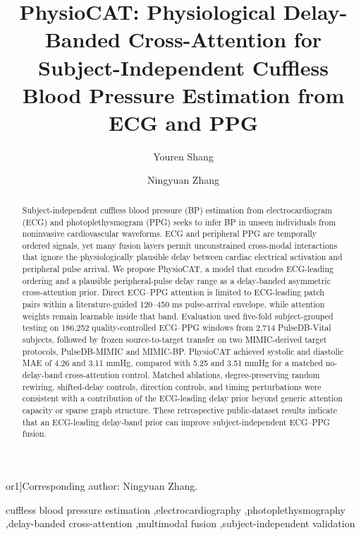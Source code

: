 \documentclass[preprint,12pt]{elsarticle}
\def\corref#1{}%
\def\cortext#1#2{}%
\def\ead#1{}%
\begin{document}
\begin{frontmatter}

\title{PhysioCAT: Physiological Delay-Banded Cross-Attention for Subject-Independent Cuffless Blood Pressure Estimation from ECG and PPG}

\author[inst1,inst2]{Youren Shang}
\author[inst1]{Ningyuan Zhang\corref{cor1}}
\ead{25b910030@stu.hit.edu.cn}
\cortext[cor1]{Corresponding author: Ningyuan Zhang.}
\address[inst1]{eHealth Research Institute, School of Management, Harbin Institute of Technology, Harbin 150001, China}
\address[inst2]{Faculty of Computing, Harbin Institute of Technology, Harbin 150001, China}

\begin{abstract}
Subject-independent cuffless blood pressure (BP) estimation from electrocardiogram (ECG) and photoplethysmogram (PPG) seeks to infer BP in unseen individuals from noninvasive cardiovascular waveforms. ECG and peripheral PPG are temporally ordered signals, yet many fusion layers permit unconstrained cross-modal interactions that ignore the physiologically plausible delay between cardiac electrical activation and peripheral pulse arrival. We propose PhysioCAT, a model that encodes ECG-leading ordering and a plausible peripheral-pulse delay range as a delay-banded asymmetric cross-attention prior. Direct ECG--PPG attention is limited to ECG-leading patch pairs within a literature-guided 120--450 ms pulse-arrival envelope, while attention weights remain learnable inside that band. Evaluation used five-fold subject-grouped testing on 186{,}252 quality-controlled ECG--PPG windows from 2{,}714 PulseDB-Vital subjects, followed by frozen source-to-target transfer on two MIMIC-derived target protocols, PulseDB-MIMIC and MIMIC-BP. PhysioCAT achieved systolic and diastolic MAE of 4.26 and 3.11 mmHg, compared with 5.25 and 3.51 mmHg for a matched no-delay-band cross-attention control. Matched ablations, degree-preserving random rewiring, shifted-delay controls, direction controls, and timing perturbations were consistent with a contribution of the ECG-leading delay prior beyond generic attention capacity or sparse graph structure. These retrospective public-dataset results indicate that an ECG-leading delay-band prior can improve subject-independent ECG--PPG fusion.
\end{abstract}

\begin{keyword}
cuffless blood pressure estimation \sep electrocardiography \sep photoplethysmography \sep delay-banded cross-attention \sep multimodal fusion \sep subject-independent validation
\end{keyword}

\end{frontmatter}
\end{document}
